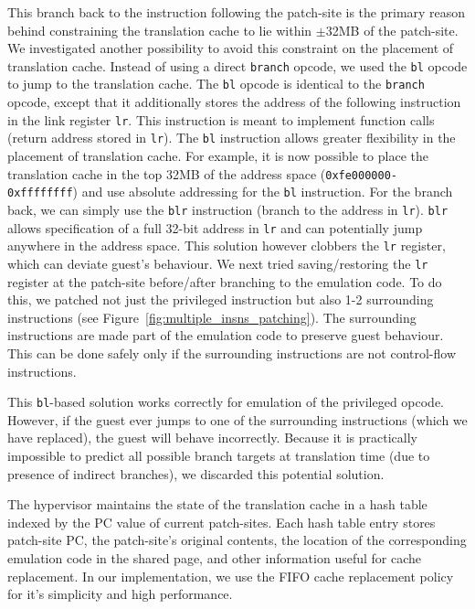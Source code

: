 \documentclass[10pt,twocolumn]{article}
\begin{document}
This branch back to the instruction following the patch-site is
the primary reason behind constraining the translation cache to lie within
$\pm$32MB of the patch-site.
We investigated another possibility to avoid this constraint on the placement
of translation cache. Instead of using a direct {\tt branch} opcode, we used
the {\tt bl} opcode to jump to the translation cache. The {\tt bl} opcode is
identical to the {\tt branch} opcode, except that it additionally stores the
address of the following instruction in the link register {\tt lr}. This instruction
is meant to implement function calls (return address stored in {\tt lr}).
The {\tt bl} instruction
allows greater flexibility in the placement of translation cache. For example, it is
now possible to place the translation cache in the top 32MB of the address
space ({\tt 0xfe000000-0xffffffff}) and use absolute addressing for the {\tt bl}
instruction. For the branch back, we can simply use the {\tt blr}
instruction (branch to the address in {\tt lr}). {\tt blr} allows specification
of a full 32-bit address in {\tt lr} and can potentially jump anywhere in the
address space.
This solution however
clobbers the {\tt lr} register, which can deviate guest's behaviour.
We next tried saving/restoring the
{\tt lr} register at the patch-site before/after branching to the emulation code.
To do this, we patched not just the privileged instruction but also 1-2
surrounding instructions (see Figure~\ref{fig:multiple_insns_patching}). The
surrounding instructions are made part of the emulation code to preserve
guest behaviour. This can
be done safely only if the surrounding instructions are not control-flow instructions.

This {\tt bl}-based solution works correctly for emulation of the privileged opcode.
However, if the guest ever jumps to one of the surrounding instructions (which we
have replaced), the guest will behave incorrectly.
Because it is practically impossible to predict all possible branch targets at
translation time (due to presence of indirect branches), we discarded this potential
solution.

The hypervisor maintains the state of the translation cache in
a hash table indexed by the PC value of current patch-sites. Each hash table
entry stores patch-site PC, the patch-site's original contents,
the location of the corresponding emulation code in the shared page, and other
information useful
for cache replacement. In our implementation, we use the FIFO cache replacement policy
for it's simplicity and high performance.
\end{document}
